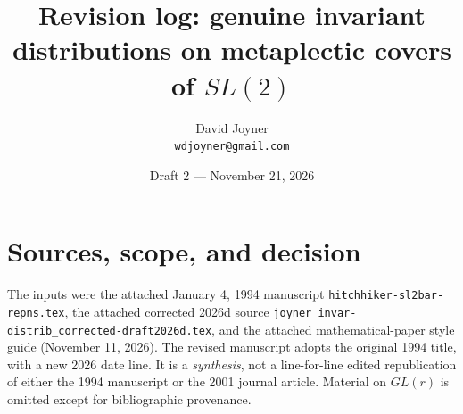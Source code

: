 \documentclass[12pt,letterpaper]{article}
\title{Revision log: genuine invariant distributions on metaplectic covers of $SL(2)$}
\author{David Joyner\\\texttt{wdjoyner@gmail.com}}
\date{Draft 2 --- November 21, 2026}
\begin{document}
\maketitle
\section*{Sources, scope, and decision}
The inputs were the attached January 4, 1994 manuscript
\texttt{hitchhiker-sl2bar-repns.tex}, the attached corrected 2026d source
\texttt{joyner\_invar-distrib\_corrected-draft2026d.tex}, and the attached
mathematical-paper style guide (November 11, 2026).  The revised manuscript
adopts the original 1994 title, with a new 2026 date line.  It is a
\emph{synthesis}, not a line-for-line edited republication of either the
1994 manuscript or the 2001 journal article.  Material on $GL(r)$ is omitted
except for bibliographic provenance.
\end{document}
